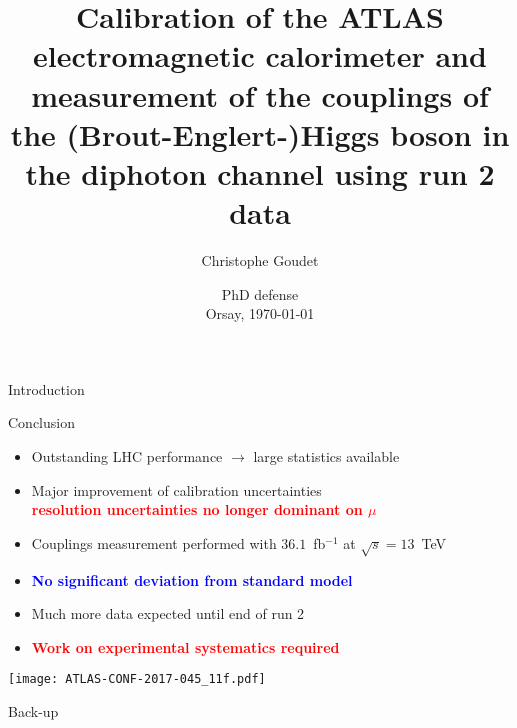 \documentclass[a4paper]{beamer}
\title[Energy calibration \& Higgs couplings]{Calibration of the ATLAS electromagnetic calorimeter and measurement of the couplings of the (Brout-Englert-)Higgs boson in the diphoton channel using run 2 data}
\author[Christophe Goudet]{Christophe Goudet}
\institute[LAL]{\texttt{[image: LAL.jpg]} }
\date[Orsay, \today]{PhD defense \\ Orsay, \today}
\begin{document}
\transboxin
\begin{frame}
\maketitle
\end{frame}

\begin{frame}{Introduction}
\tableofcontents
\end{frame}





\begin{frame}{Conclusion}

  \begin{itemize}
  \item Outstanding LHC performance $\rightarrow$ large statistics available
  \item Major improvement of calibration uncertainties \\
    \textcolor{red}{\bf resolution uncertainties no longer dominant on $\mu$}
  \item Couplings measurement performed with $36.1$~fb$^{-1}$ at $\sqrt{s}=13$~TeV
  \item \textcolor{blue}{\bf No significant deviation from standard model}
    \end{itemize}

  \begin{minipage}{0.39\linewidth}
    \begin{itemize}
    \item Much more data expected until end of run 2
    \item \textcolor{red}{\bf Work on experimental systematics required}
    \end{itemize}
  \end{minipage}
  \begin{minipage}{0.6\linewidth}
    \texttt{[image: ATLAS-CONF-2017-045\_11f.pdf]}
  \end{minipage}
\end{frame}

\appendix
\begin{frame}{Back-up}
\tableofcontents
\end{frame}





\end{document}
